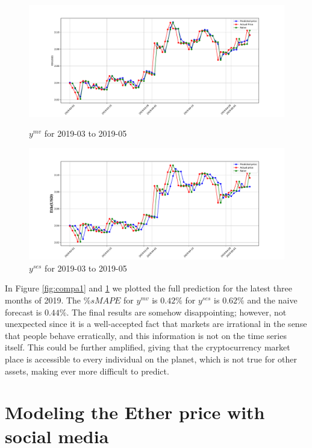 \begin{figure}[h!]
	\centering
	\begin{minipage}[b]{\textwidth}
		\includegraphics[width=\textwidth]{notebooks/data/pre_2019_mv.pdf}
		\caption{$y^{mv}$ for 2019-03 to 2019-05}
		\label{fig:compa1}
	\end{minipage}
	\hfill
	\begin{minipage}[b]{\textwidth}
		\includegraphics[width=\textwidth]{notebooks/data/pre_2019_ses.pdf}
		\caption{$y^{ses}$ for 2019-03 to 2019-05}
		\label{fig:compa2}
	\end{minipage}
\end{figure}

In Figure \ref{fig:compa1} and \ref{fig:compa2} we plotted the full prediction for the latest three months of 2019. The $\%sMAPE$ for 
$y^{mv}$ is $0.42\%$ for $y^{ses}$ is $0.62\%$ and the naive forecast is $0.44\%$. The final results are somehow disappointing; however, not unexpected since it is a well-accepted fact that markets are irrational in the sense that people behave erratically, and this information is not on the time series itself. This could be further amplified, giving that the cryptocurrency market place is accessible to every individual on the planet, which is not true for other assets, making ever more difficult to predict.


\section{Modeling the Ether price with social media}

